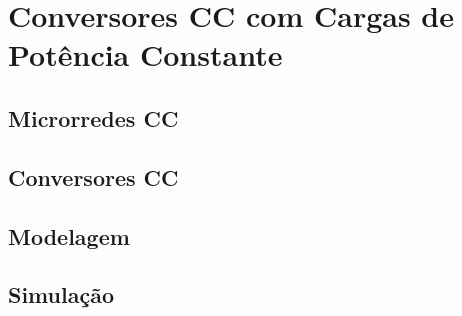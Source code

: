 \chapter{Conversores CC com Cargas de Potência Constante} \label{cap3}


\section{Microrredes CC}

\section{Conversores CC}

\section{Modelagem}


\section{Simulação}
